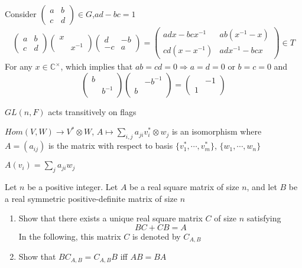 \documentclass[main]{subfiles}
\begin{document}
\begin{solution}
Consider $\begin{pmatrix}
a&b \\
c&d
\end{pmatrix}\in G$,$ad-bc=1$
\begin{align*}
\begin{pmatrix}
a&b \\
c&d
\end{pmatrix}
\begin{pmatrix}
x& \\
&x^{-1}
\end{pmatrix}
\begin{pmatrix}
d&-b \\
-c&a
\end{pmatrix}=
\begin{pmatrix}
adx-bcx^{-1}&ab(x^{-1}-x) \\
cd(x-x^{-1})&adx^{-1}-bcx
\end{pmatrix}\in T
\end{align*}
For any $x\in\mathbb C^\times$, which implies that $ab=cd=0\Rightarrow a=d=0$ or $b=c=0$ and
\[\begin{pmatrix}
b& \\
&b^{-1}
\end{pmatrix}
\begin{pmatrix}
&-b^{-1} \\
b&
\end{pmatrix}=
\begin{pmatrix}
&-1 \\
1&
\end{pmatrix}\]
\end{solution}

\begin{exercise}\label{GL(n,F) acts transitively on flags}
$GL(n,F)$ acts transitively on flags
\end{exercise}

\begin{exercise}\label{Hom(V,W)=V^* tensor W}
$Hom(V,W)\to V^*\otimes W$, $A\mapsto\sum_{i,j}a_{ji}v^*_i\otimes w_j$ is an isomorphism where $A=(a_{ij})$ is the matrix with respect to basis $\{v_1^*,\cdots,v_m^*\}$, $\{w_1,\cdots,w_n\}$
\end{exercise}

\begin{solution}
$A(v_i)=\sum_ja_{ji}w_j$
\end{solution}

\begin{exercise}
Let $n$ be a positive integer. Let $A$ be a real square matrix of size $n$, and let $B$ be a real symmetric positive-definite matrix of size $n$
\begin{enumerate}[leftmargin=*,label=\textbf{\arabic*.}]
\item Show that there exists a unique real square matrix $C$ of size $n$ satisfying
\begin{equation}\label{BC+CB=A}
BC+CB=A
\end{equation}
In the following, this matrix $C$ is denoted by $C_{A,B}$
\item Show that $BC_{A,B}=C_{A,B}B$ iff $AB=BA$
\end{enumerate}
\end{exercise}
\end{document}
